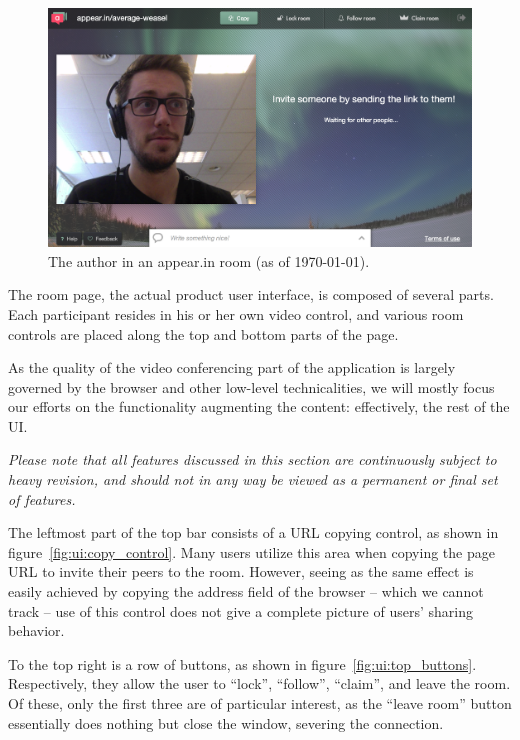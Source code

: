     \begin{figure}[t]
      \centering
        \includegraphics[width=\textwidth]{Figures/screenshots/appearin/in-room}
        \caption{The author in an appear.in room (as of \today).}
        \label{fig:appearin_room}
    \end{figure}

    The room page, the actual product user interface, is composed of several parts. Each participant resides in his or her own video control, and various room controls are placed along the top and bottom parts of the page.

    As the quality of the video conferencing part of the application is largely governed by the browser and other low-level technicalities, we will mostly focus our efforts on the functionality augmenting the content: effectively, the rest of the UI.

    \emph{Please note that all features discussed in this section are continuously subject to heavy revision, and should not in any way be viewed as a permanent or final set of features.}

    The leftmost part of the top bar consists of a URL copying control, as shown in figure~\ref{fig:ui:copy_control}. Many users utilize this area when copying the page URL to invite their peers to the room. However, seeing as the same effect is easily achieved by copying the address field of the browser -- which we cannot track -- use of this control does not give a complete picture of users' sharing behavior.

    To the top right is a row of buttons, as shown in figure~\ref{fig:ui:top_buttons}. Respectively, they allow the user to ``lock'', ``follow'', ``claim'', and leave the room. Of these, only the first three are of particular interest, as the ``leave room'' button essentially does nothing but close the window, severing the connection.


